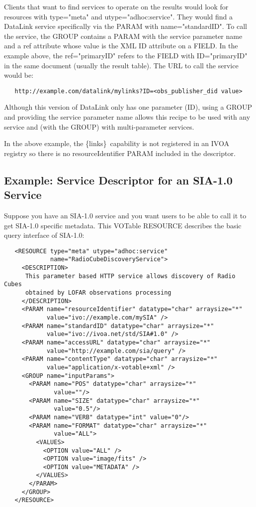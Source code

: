 \documentclass[11pt,a4paper]{ivoa}
\newcommand{\blinks}{\{links\}}
\newcommand{\attval}[2]{#1={\allowbreak}{"}#2{"}}
\begin{document}
Clients that want to find services to operate on the results would look
for resources with \attval{type}{meta} and \attval{utype}{adhoc:service}.
They would find a DataLink service specifically via the PARAM with
\attval{name}{standardID}. To call the service, the GROUP contains a PARAM
with the service parameter name and a ref attribute whose value is the
XML ID attribute on a FIELD. In the example above, the \attval{ref}{primaryID}
refers to the FIELD with \attval{ID}{primaryID} in the same document (usually
the result table). The URL to call the service would be:
\begin{verbatim}
   http://example.com/datalink/mylinks?ID=<obs_publisher_did value>
\end{verbatim}

Although this version of DataLink only has one parameter (ID), using a
GROUP and providing the service parameter name allows this recipe to be
used with any service and (with the GROUP) with multi-parameter services.

In the above example, the \blinks\ capability is not registered in an
IVOA registry so there is no resourceIdentifier PARAM included in the
descriptor.


\subsection{Example: Service Descriptor for an SIA-1.0 Service}

Suppose you have an SIA-1.0 service and you want users to be able to
call it to get SIA-1.0 specific metadata. This VOTable RESOURCE describes
the basic query interface of SIA-1.0:
\begin{verbatim}
   <RESOURCE type="meta" utype="adhoc:service" 
             name="RadioCubeDiscoveryService">
     <DESCRIPTION> 
      This parameter based HTTP service allows discovery of Radio Cubes 
      obtained by LOFAR observations processing 
     </DESCRIPTION>
     <PARAM name="resourceIdentifier" datatype="char" arraysize="*"
            value="ivo://example.com/mySIA" />
     <PARAM name="standardID" datatype="char" arraysize="*"
            value="ivo://ivoa.net/std/SIA#1.0" />
     <PARAM name="accessURL" datatype="char" arraysize="*"
            value="http://example.com/sia/query" />
     <PARAM name="contentType" datatype="char" arraysize="*" 
            value="application/x-votable+xml" />
     <GROUP name="inputParams">
       <PARAM name="POS" datatype="char" arraysize="*"
              value=""/>
       <PARAM name="SIZE" datatype="char" arraysize="*"
              value="0.5"/>
       <PARAM name="VERB" datatype="int" value="0"/>
       <PARAM name="FORMAT" datatype="char" arraysize="*"
              value="ALL">
         <VALUES>
           <OPTION value="ALL" />
           <OPTION value="image/fits" />
           <OPTION value="METADATA" />
         </VALUES>
       </PARAM>
     </GROUP>
   </RESOURCE>
\end{verbatim}
\end{document}
